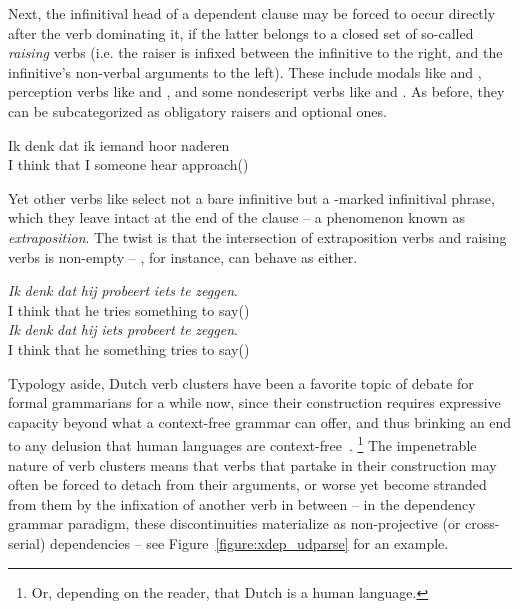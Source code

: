 Next, the infinitival head of a dependent clause may be forced to occur directly after the verb dominating it, if the latter belongs to a closed set of so-called \textit{raising} verbs (i.e. the raiser is infixed between the infinitive to the right, and the infinitive's non-verbal arguments to the left).
These include modals like  and , perception verbs like  and , and some nondescript verbs like  and .
As before, they can be subcategorized as obligatory raisers and optional ones.
\begin{exe}
\ex
\gll Ik denk dat ik iemand hoor naderen\\
I think that I someone hear approach()\\
\end{exe}
Yet other verbs like  select not a bare infinitive but a -marked infinitival phrase, which they leave intact at the end of the clause -- a phenomenon known as \textit{extraposition}.
The twist is that the intersection of extraposition verbs and raising verbs is non-empty -- , for instance, can behave as either.

\goodbreak\begin{exe}
\ex\label{gloss:vr_vs_xpos}
\begin{xlist}
\ex
\gll \textit{Ik} \textit{denk} \textit{dat} \textit{hij} \textit{probeert} \textit{iets} \textit{te} \textit{zeggen}.\\
I think that he tries something to say()\\
\ex
\gll \textit{Ik} \textit{denk} \textit{dat} \textit{hij} \textit{iets} \textit{probeert} \textit{te} \textit{zeggen}.\\
I think that he something tries to say()\\
\end{xlist}
\end{exe}

Typology aside, Dutch verb clusters have been a favorite topic of debate for formal grammarians for a while now, since their construction requires expressive capacity beyond what a context-free grammar can offer, and thus brinking an end to any delusion that human languages are context-free~\cite[\textit{inter alia}]{huybregts1984weak,shieber1985evidence}.%
	\footnote{Or, depending on the reader, that Dutch is a human language.}%
The impenetrable nature of verb clusters means that verbs that partake in their construction may often be forced to detach from their arguments, or worse yet become stranded from them by the infixation of another verb in between -- in the dependency grammar paradigm, these discontinuities materialize as non-projective (or cross-serial) dependencies -- see Figure~\ref{figure:xdep_udparse} for an example.

